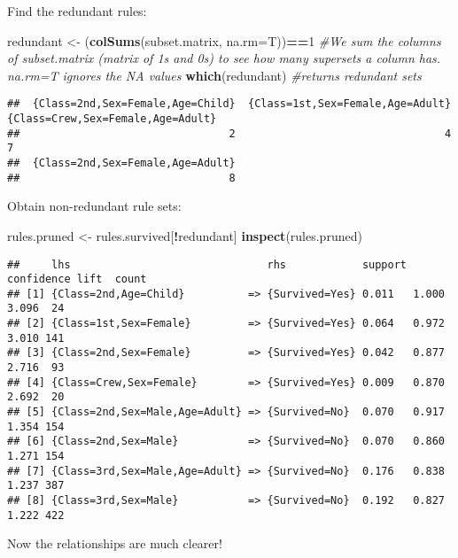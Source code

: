 \documentclass[]{article}
\newenvironment{Shaded}{\begin{snugshade}}{\end{snugshade}}
\newcommand{\CommentTok}[1]{\textcolor[rgb]{0.56,0.35,0.01}{\textit{#1}}}
\newcommand{\DataTypeTok}[1]{\textcolor[rgb]{0.13,0.29,0.53}{#1}}
\newcommand{\DecValTok}[1]{\textcolor[rgb]{0.00,0.00,0.81}{#1}}
\newcommand{\KeywordTok}[1]{\textcolor[rgb]{0.13,0.29,0.53}{\textbf{#1}}}
\newcommand{\NormalTok}[1]{#1}
\newcommand{\OperatorTok}[1]{\textcolor[rgb]{0.81,0.36,0.00}{\textbf{#1}}}
\newcommand{\StringTok}[1]{\textcolor[rgb]{0.31,0.60,0.02}{#1}}
\begin{document}
Find the redundant rules:

\begin{Shaded}
\begin{Highlighting}[]
\NormalTok{redundant <-}\StringTok{ }\NormalTok{(}\KeywordTok{colSums}\NormalTok{(subset.matrix, }\DataTypeTok{na.rm=}\NormalTok{T))}\OperatorTok{==}\DecValTok{1}  \CommentTok{#We sum the columns of subset.matrix (matrix of 1s and 0s) to see how many supersets a column has. na.rm=T ignores the NA values}
\KeywordTok{which}\NormalTok{(redundant) }\CommentTok{#returns redundant sets}
\end{Highlighting}
\end{Shaded}

\begin{verbatim}
##  {Class=2nd,Sex=Female,Age=Child}  {Class=1st,Sex=Female,Age=Adult} {Class=Crew,Sex=Female,Age=Adult} 
##                                 2                                 4                                 7 
##  {Class=2nd,Sex=Female,Age=Adult} 
##                                 8
\end{verbatim}

Obtain non-redundant rule sets:

\begin{Shaded}
\begin{Highlighting}[]
\NormalTok{rules.pruned <-}\StringTok{ }\NormalTok{rules.survived[}\OperatorTok{!}\NormalTok{redundant]}
\KeywordTok{inspect}\NormalTok{(rules.pruned)}
\end{Highlighting}
\end{Shaded}

\begin{verbatim}
##     lhs                               rhs            support confidence lift  count
## [1] {Class=2nd,Age=Child}          => {Survived=Yes} 0.011   1.000      3.096  24  
## [2] {Class=1st,Sex=Female}         => {Survived=Yes} 0.064   0.972      3.010 141  
## [3] {Class=2nd,Sex=Female}         => {Survived=Yes} 0.042   0.877      2.716  93  
## [4] {Class=Crew,Sex=Female}        => {Survived=Yes} 0.009   0.870      2.692  20  
## [5] {Class=2nd,Sex=Male,Age=Adult} => {Survived=No}  0.070   0.917      1.354 154  
## [6] {Class=2nd,Sex=Male}           => {Survived=No}  0.070   0.860      1.271 154  
## [7] {Class=3rd,Sex=Male,Age=Adult} => {Survived=No}  0.176   0.838      1.237 387  
## [8] {Class=3rd,Sex=Male}           => {Survived=No}  0.192   0.827      1.222 422
\end{verbatim}

Now the relationships are much clearer!
\end{document}
